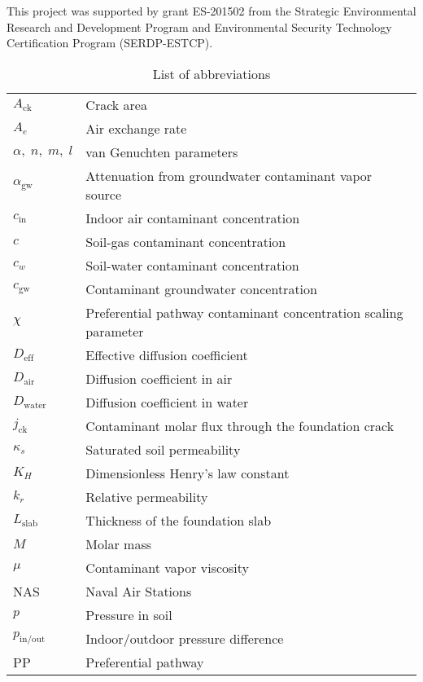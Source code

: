 \documentclass[journal=esthag,manuscript=article]{achemso}
\begin{document}
\begin{acknowledgement}
 This project was supported by grant ES-201502 from the Strategic Environmental Research and Development Program and Environmental Security Technology Certification Program (SERDP-ESTCP).
\end{acknowledgement}

\begin{table}[htb!]
  \caption{List of abbreviations}\label{tbl:abbreviations}
\begin{tabular}{l l}
  \toprule
  $A_\mathrm{ck}$ & Crack area \\
  $A_e$ & Air exchange rate \\
  $\alpha, \; n, \; m, \; l$ & van Genuchten parameters \\
  $\alpha_\mathrm{gw}$ & Attenuation from groundwater contaminant vapor source \\
  $c_\mathrm{in}$ & Indoor air contaminant concentration \\
  $c$ & Soil-gas contaminant concentration \\
  $c_w$ & Soil-water contaminant concentration \\
  $c_\mathrm{gw}$ & Contaminant groundwater concentration \\
  $\chi$ & Preferential pathway contaminant concentration scaling parameter \\
  $D_\mathrm{eff}$ & Effective diffusion coefficient \\
  $D_\mathrm{air}$ & Diffusion coefficient in air \\
  $D_\mathrm{water}$ & Diffusion coefficient in water \\
  $j_\mathrm{ck}$ & Contaminant molar flux through the foundation crack \\
  $\kappa_s$ & Saturated soil permeability \\
  $K_H$ & Dimensionless Henry's law constant \\
  $k_r$ & Relative permeability \\
  $L_\mathrm{slab}$ & Thickness of the foundation slab \\
  $M$ & Molar mass \\
  $\mu$ & Contaminant vapor viscosity \\
  NAS & Naval Air Stations \\
  $p$ & Pressure in soil \\
  $p_\mathrm{in/out}$ & Indoor/outdoor pressure difference \\
  PP & Preferential pathway \\

\end{tabular}
\end{table}
\end{document}
